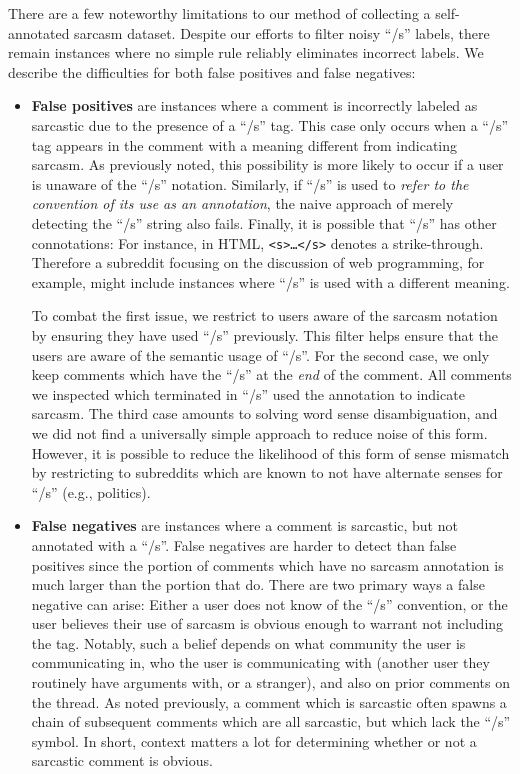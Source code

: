 \documentclass[10pt, a4paper]{article}
\begin{document}
There are a few noteworthy limitations to our method of collecting a self-annotated sarcasm dataset. Despite our efforts to filter noisy ``/s'' labels, there remain instances where no simple rule reliably eliminates incorrect labels. We describe the difficulties for both false positives and false negatives:
\begin{itemize}

\item \textbf{False positives} are instances where a comment is incorrectly labeled as sarcastic due to the presence of a ``/s'' tag. This case only occurs when a ``/s'' tag appears in the comment with a meaning different from indicating sarcasm. As previously noted, this possibility is more likely to occur if a user is unaware of the ``/s'' notation. Similarly, if ``/s'' is used to \textit{refer to the convention of its use as an annotation}, the naive approach of merely detecting the ``/s'' string also fails. Finally, it is possible that ``/s'' has other connotations: For instance, in HTML, \texttt{<s>\dots</s>} denotes a strike-through. Therefore a subreddit focusing on the discussion of web programming, for example, might include instances where ``/s'' is used with a different meaning.

To combat the first issue, we restrict to users aware of the sarcasm notation by ensuring they have used ``/s'' previously. This filter helps ensure that the users are aware of the semantic usage of ``/s''. For the second case, we only keep comments which have the ``/s''  at the \textit{end} of the comment. All comments we inspected which terminated in ``/s'' used the annotation to indicate sarcasm. The third case amounts to solving word sense disambiguation, and we did not find a universally simple approach to reduce noise of this form. However, it is possible to reduce the likelihood of this form of sense mismatch by restricting to subreddits which are known to not have alternate senses for ``/s'' (e.g., politics). 

\item \textbf{False negatives} are instances where a comment is sarcastic, but not annotated with a ``/s''. False negatives are harder to detect than false positives since the portion of comments which have no sarcasm annotation is much larger than the portion that do. There are two primary ways a false negative can arise: Either a user does not know of the ``/s'' convention, or the user believes their use of sarcasm is obvious enough to warrant not including the tag. Notably, such a belief depends on what community the user is communicating in, who the user is communicating with (another user they routinely have arguments with, or a stranger), and also on prior comments on the thread. As noted previously, a comment which is sarcastic often spawns a chain of subsequent comments which are all sarcastic, but which lack the ``/s'' symbol. In short, context matters a lot for determining whether or not a sarcastic comment is obvious. 


\end{itemize}
\end{document}
